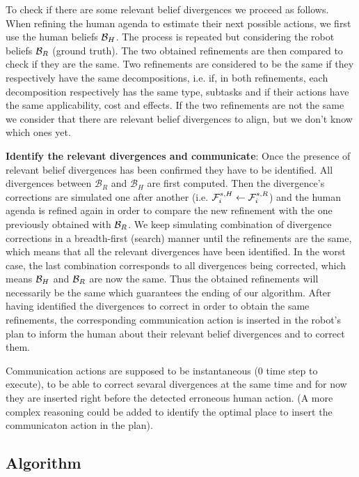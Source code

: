 \documentclass[letterpaper]{article} %
\begin{document}
To check if there are some relevant belief divergences we proceed as follows. When refining the human agenda to estimate their next possible actions, we first use the human beliefs $\mathcal{B}_H$. The process is repeated but considering the robot beliefs $\mathcal{B}_R$ (ground truth). The two obtained refinements are then compared to check if they are the same. Two refinements are considered to be the same if they respectively have the same decompositions, i.e. if, in both refinements, each decomposition respectively has the same type, subtasks and if their actions have the same applicability, cost and effects. If the two refinements are not the same we consider that there are relevant belief divergences to align, but we don't know which ones yet.

\textbf{Identify the relevant divergences and communicate}: 
Once the presence of relevant belief divergences has been confirmed they have to be identified. All divergences between $\mathcal{B}_R$ and $\mathcal{B}_H$ are first computed. Then the divergence's corrections are simulated one after another (i.e. $ \mathcal{F}^{s,H}_{i} \gets \mathcal{F}^{s,R}_{i}$) and the human agenda is refined again in order to compare the new refinement with the one previously obtained with $\mathcal{B}_R$. We keep simulating combination of divergence corrections in a breadth-first (search) manner until the refinements are the same, which means that all the relevant divergences have been identified. In the worst case, the last combination corresponds to all divergences being corrected, which means $\mathcal{B}_H$ and $\mathcal{B}_R$ are now the same. Thus the obtained refinements will necessarily be the same which guarantees the ending of our algorithm. After having identified the divergences to correct in order to obtain the same refinements, the corresponding communication action is inserted in the robot's plan to inform the human about their relevant belief divergences and to correct them.
    
Communication actions are supposed to be instantaneous (0 time step to execute), to be able to correct sevaral divergences at the same time and for now they are inserted right before the detected erroneous human action. (A more complex reasoning could be added to identify the optimal place to insert the communicaton action in the plan). 

\subsection{Algorithm}
\end{document}
